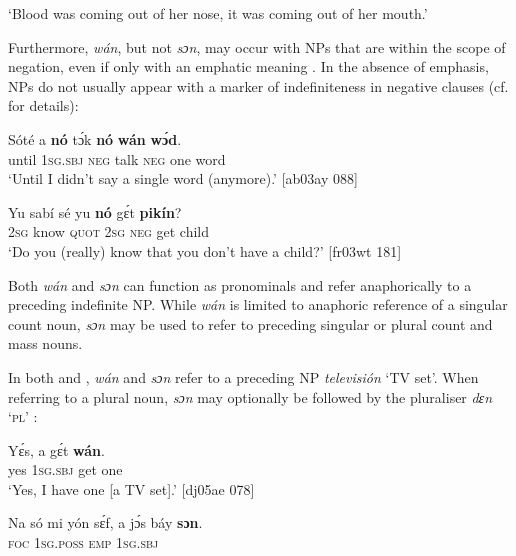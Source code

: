 \glt ‘Blood was coming out of her nose, it was coming out of her mouth.’\textstylePichiexamplenumberZchnZchn{ [ab03ay 125]}
\z

Furthermore, \textit{wán}, but not \textit{sɔn}, may occur with NPs that are within the scope of negation, even if only with an emphatic meaning . In the absence of emphasis, NPs do not usually appear with a marker of indefiniteness in negative clauses  (cf.  for details): 


\ea%
    \label{ex:key:183}
    \gll Sóté    a    \textbf{nó}  tɔ́k  \textbf{nó}  \textbf{wán}    \textbf{wɔ́d}.\\
until  \textsc{1sg.sbj}  \textsc{neg}  talk  \textsc{neg}  one    word\\

\glt ‘Until I didn’t say a single word (anymore).’ [ab03ay 088]
\z


\ea%
    \label{ex:key:184}
    \gll Yu  sabí    sé    yu  \textbf{nó}  gɛ́t  \textbf{pikín}?\\
\textsc{2sg}  know  \textsc{quot}    \textsc{2sg}  \textsc{neg}  get  child\\

\glt ‘Do you (really) know that you don’t have a child?’ [fr03wt 181]
\z

Both \textit{wán} and \textit{sɔn} can function as pronominals and refer anaphorically to a preceding indefinite NP. While \textit{wán} is limited to anaphoric reference of a singular count noun, \textit{sɔn} may be used to refer to preceding singular or plural count and mass nouns. 


In both  and , \textit{wán} and \textit{sɔn} refer to a preceding NP \textit{televisión} ‘TV set’. When referring to a plural noun, \textit{sɔn} may optionally be followed by the pluraliser \textit{dɛn} ‘\textsc{pl}’ : 



\ea%
    \label{ex:key:185}
    \gll Yɛ́s,    a    gɛ́t  \textbf{wán}.\\
yes    \textsc{1sg.sbj}  get  one\\

\glt ‘Yes, I have one [a TV set].’ [dj05ae 078]
\z


\ea%
    \label{ex:key:186}
    \gll Na  só    mi    yón     sɛ́f,  a    jɔ́s  báy  \textbf{sɔn}.\\
\textsc{foc}    \textsc{1sg.poss}   \textsc{emp} \textsc{1sg.sbj}   \\

